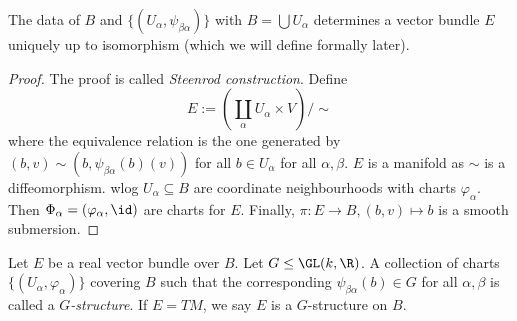 \documentclass[a4paper]{article}
\begin{document}
\begin{proposition}
  The data of \(B\) and \(\{(U_\alpha, \psi_{\beta\alpha})\}\) with \(B = \bigcup U_\alpha\) determines a vector bundle \(E\) uniquely up to isomorphism (which we will define formally later).
\end{proposition}

\begin{proof}
  The proof is called \emph{Steenrod construction}. Define
  \[
    E := \left(\coprod_\alpha U_\alpha \times V\right) / \sim
  \]
  where the equivalence relation is the one generated by \((b, v) \sim (b, \psi_{\beta\alpha}(b)(v))\) for all \(b \in U_\alpha\) for all \(\alpha, \beta\). \(E\) is a manifold as \(\sim\) is a diffeomorphism. wlog \(U_\alpha \subseteq B\) are coordinate neighbourhoods with charts \(\varphi_\alpha\). Then \(\Phi_\alpha = (\varphi_\alpha, \id)\) are charts for \(E\). Finally, \(\pi: E \to B, (b, v) \mapsto b\) is a smooth submersion.
\end{proof}

\begin{definition}[\(G\)-structure]
  Let \(E\) be a real vector bundle over \(B\). Let \(G \leq \GL(k, \R)\). A collection of charts \(\{(U_\alpha, \varphi_\alpha)\}\) covering \(B\) such that the corresponding \(\psi_{\beta\alpha}(b) \in G\) for all \(\alpha, \beta\) is called a \emph{\(G\)-structure}. If \(E = TM\), we say \(E\) is a \(G\)-structure on \(B\).
\end{definition}
\end{document}
